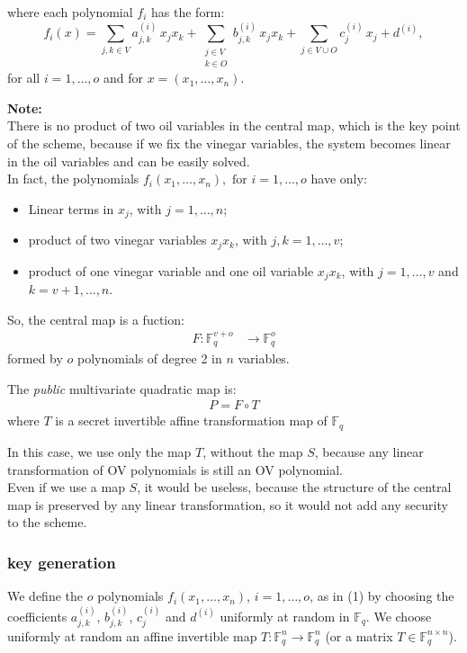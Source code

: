 \noindent
where each polynomial $f_i$ has the form:
\begin{equation*}
    f_i(x) = \sum_{j,k\in V} a^{(i)}_{j,k}\,x_jx_k
           + \sum_{\substack{j\in V\\k\in O}} b^{(i)}_{j,k}\,x_jx_k
           + \sum_{j\in V\cup O} c^{(i)}_j\,x_j + d^{(i)},
\end{equation*}
for all $i=1,\dots,o$ and for $x=(x_1,\dots,x_n)$.
\medskip

\noindent
\textbf{Note:}\\
There is no product of two oil variables in the central map, which is the key point of the scheme, because if we fix the vinegar variables, the system becomes linear in the oil variables and can be easily solved.\\
In fact, the polynomials $f_i(x_1, \ldots, x_n), \text{ for } i=1,\dots,o$ have only:
\begin{itemize}
    \item Linear terms in $x_j$, with $j=1,\dots,n$;
    \item product of two vinegar variables $x_jx_k$, with $j,k=1,\dots,v$;
    \item product of one vinegar variable and one oil variable $x_jx_k$, with $j=1,\dots,v$ and $k=v+1,\dots,n$.
\end{itemize}
\bigskip    

\noindent
So, the central map is a fuction:
\begin{align*}
    F: \mathbb{F}_q^{v+o} & \to \mathbb{F}_q^o
\end{align*}
\medskip
formed by $o$ polynomials of degree 2 in $n$ variables.
\vspace{1.5 cm}

\noindent
The \textit{public} multivariate quadratic map is:
\begin{align*}
    P = F \circ T
\end{align*}
\noindent
where $T$ is a secret invertible affine transformation map of $\mathbb{F}_q$
\medskip

\noindent
In this case, we use only the map $T$, without the map $S$, because any linear transformation of OV polynomials is still an OV polynomial.\\
Even if we use a map $S$, it would be useless, because the structure of the central map is preserved by any linear transformation, so it would not add any security to the scheme.

\subsubsection{key generation}
\begin{algorithm}
\begin{algorithmic}[1]
    \State We define the $o$ polynomials $f_i(x_1,\dots,x_n)$, $i=1,\dots,o$, as in (1) by choosing the coefficients $a^{(i)}_{j,k}$, $b^{(i)}_{j,k}$, $c^{(i)}_j$ and $d^{(i)}$ uniformly at random in $\mathbb{F}_q$.
    \State We choose uniformly at random an affine invertible map $T:\mathbb{F}_q^n \to \mathbb{F}_q^n$ (or a matrix $T\in\mathbb{F}_q^{n\times n}$).
\end{algorithmic}
\end{algorithm}



